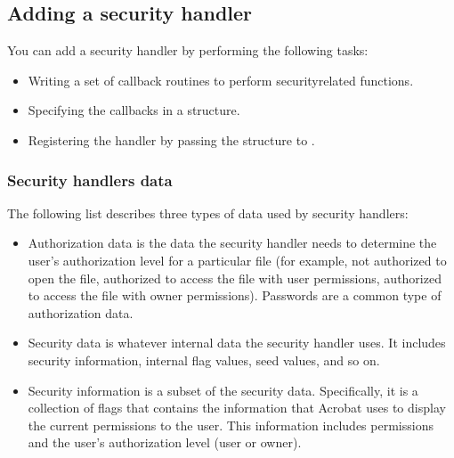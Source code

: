 \documentclass[letterpaper,12pt,english,openany,oneside]{sphinxmanual}
\begin{document}
\subsection{Adding a security handler}
\label{\detokenize{Plugins_Security:adding-a-security-handler}}
You can add a security handler by performing the following tasks:
\begin{itemize}
\item {} 
Writing a set of callback routines to perform security\sphinxhyphen{}related functions.

\item {} 
Specifying the callbacks in a  structure.

\item {} 
Registering the handler by passing the structure to .

\end{itemize}


\subsubsection{Security handlers data}
\label{\detokenize{Plugins_Security:security-handlers-data}}
The following list describes three types of data used by security handlers:
\begin{itemize}
\item {} 
Authorization data is the data the security handler needs to determine the user’s authorization level for a particular file (for example, not authorized to open the file, authorized to access the file with user permissions, authorized to access the file with owner permissions). Passwords are a common type of authorization data.

\item {} 
Security data is whatever internal data the security handler uses. It includes security information, internal flag values, seed values, and so on.

\item {} 
Security information is a subset of the security data. Specifically, it is a collection of flags that contains the information that Acrobat uses to display the current permissions to the user. This information includes permissions and the user’s authorization level (user or owner).

\end{itemize}
\end{document}
